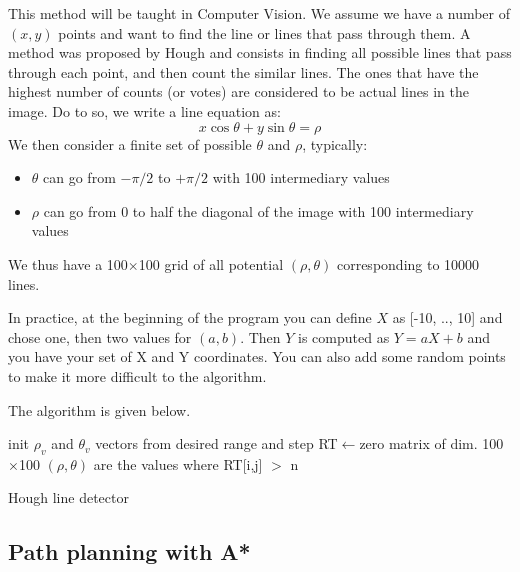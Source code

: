 \documentclass{ecnreport}
\begin{document}
 This method will be taught in Computer Vision. We assume we have a number of $(x,y)$ points and want to find the line or lines that pass through them.
 A method was proposed by Hough and consists in finding all possible lines that pass through each point, and then count the similar lines. The ones that have
 the highest number of counts (or votes) are considered to be actual lines in the image.
 Do to so, we write a line equation as:
 \begin{equation*}
  x\cos\theta + y\sin\theta = \rho
 \end{equation*}We then consider a finite set of possible $\theta$ and $\rho$, typically:
 \begin{itemize}
  \item $\theta$ can go from $-\pi/2$ to $+\pi/2$ with 100 intermediary values
  \item $\rho$ can go from 0 to half the diagonal of the image with 100 intermediary values
 \end{itemize}
 We thus have a 100$\times$100 grid of all potential $(\rho,\theta)$ corresponding to 10000 lines.
 
 In practice, at the beginning of the program you can define $X$ as [-10, .., 10] and chose one, then two values for $(a,b)$.
 Then $Y$ is computed as $Y=aX+b$ and you have your set of X and Y coordinates. You can also add some random points to make it more difficult to the algorithm.
 
 The algorithm is given below.

 
\begin{algorithm}[!h]
{}
init $\rho_v$ and $\theta_v$ vectors from desired range and step\;
RT$\gets$zero matrix of dim. 100$\times$100\;
$(\rho,\theta)$ are the values where RT[i,j] $>$ n\;
\caption{Hough line detector}
\label{algo:hough}
\end{algorithm}

\begin{itemize}
 \end{itemize}
 
 
 
 
 \subsection{Path planning with A*}
 
\end{document}
